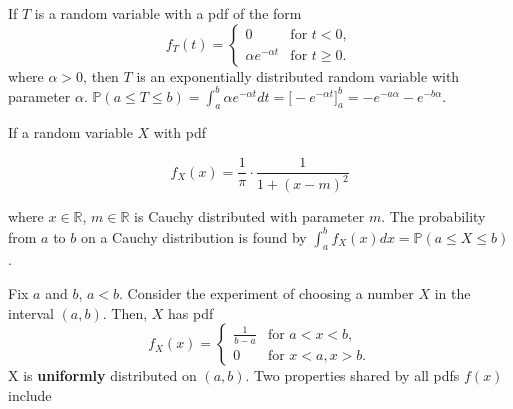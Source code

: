 \documentclass[12pt]{article}
\newcommand{\R}{\mathbb{R}}
\newcommand{\prob}[1]{\mathbb{P}(#1)}
\newcommand\gauss[2]{1/(#2*sqrt(2*pi))*exp(-((x-#1)^2)/(2*#2^2))}
\begin{document}
\begin{center}
\end{center}

\noindent
If $T$ is a random variable with a pdf of the form \[ f_T(t) =  \begin{cases} 
      0 & \text{for } t < 0, \\
      \alpha e^{- \alpha t} & \text{for } t \geq 0.
      \end{cases} \] where $\alpha > 0$, then $T$ is an exponentially distributed random variable with parameter $\alpha$. $\prob{a \leq T \leq b} = \int_{a}^{b} \alpha e^{-\alpha t} dt = \big [ -e^{-\alpha t} \big ]_{a}^{b} = -e^{-a\alpha} - e^{-b \alpha }$.
      

\vspace{.3cm}
\noindent
If a random variable $X$ with pdf 

\begin{equation*}
f_X(x) = \frac{1}{\pi} \cdot \frac{1}{1 + (x-m)^2}
\end{equation*}

\noindent
where $x \in \R$, $m \in \R$ is Cauchy distributed with parameter $m$. The probability from $a$ to $b$ on a Cauchy distribution is found by $\int_{a}^{b} f_X(x) dx = \prob{a \leq X \leq b}$. 

\vspace{.3cm}
\noindent
Fix $a$ and $b$, $a < b$. Consider the experiment of choosing a number $X$ in the interval $(a, b)$. Then, $X$ has pdf \[ f_X(x) =  \begin{cases} 
      \frac{1}{b-a} & \text{for } a < x < b, \\
      0 & \text{for } x < a, x > b.
      \end{cases} \] X is \textbf{uniformly} distributed on $(a, b)$. Two properties shared by all pdfs $f(x)$ include 
    
\end{document}
